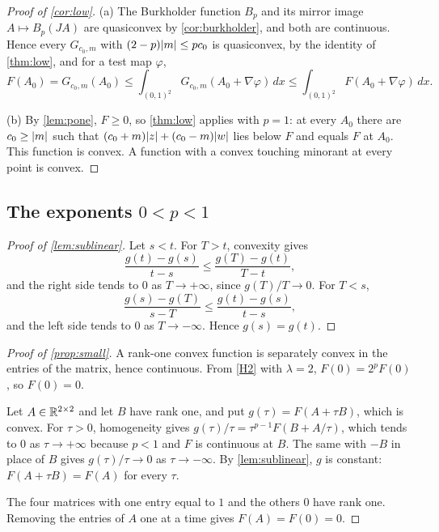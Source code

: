 \begin{proof}[Proof of \cref{cor:low}]
(a) The Burkholder function $B_p$ and its mirror image $A\mapsto B_p(JA)$ are quasiconvex by
\cref{cor:burkholder}, and both are continuous. Hence every
$G_{c_0,m}$ with $(2-p)\lvert m\rvert\le pc_0$ is quasiconvex, by the identity of \cref{thm:low}, and
for a test map $\varphi$,
\[
  F(A_0)=G_{c_0,m}(A_0)\le\int_{(0,1)^2}G_{c_0,m}(A_0+\nabla\varphi)\,dx
  \le\int_{(0,1)^2}F(A_0+\nabla\varphi)\,dx .
\]

(b) By \cref{lem:pone}, $F\ge0$, so \cref{thm:low} applies with $p=1$: at every
$A_0$ there are $c_0\ge\lvert m\rvert$ such that $(c_0+m)\lvert z\rvert+(c_0-m)\lvert w\rvert$ lies below $F$ and equals
$F$ at $A_0$. This function is convex. A function with a convex touching minorant at every
point is convex.
\end{proof}

\subsection{The exponents \texorpdfstring{$0<p<1$}{0 < p < 1}}

\begin{proof}[Proof of \cref{lem:sublinear}]
Let $s<t$. For $T>t$, convexity gives
\[
  \frac{g(t)-g(s)}{t-s}\le\frac{g(T)-g(t)}{T-t},
\]
and the right side tends to $0$ as $T\to+\infty$, since $g(T)/T\to0$. For $T<s$,
\[
  \frac{g(s)-g(T)}{s-T}\le\frac{g(t)-g(s)}{t-s},
\]
and the left side tends to $0$ as $T\to-\infty$. Hence $g(s)=g(t)$.
\end{proof}

\begin{proof}[Proof of \cref{prop:small}]
A rank-one convex function is separately convex in the entries of the matrix, hence continuous.
From \ref{H2} with $\lambda=2$, $F(0)=2^pF(0)$, so $F(0)=0$.

Let $A\in\mathbb{R}^{2\times 2}$ and let $B$ have rank one, and put $g(\tau)=F(A+\tau B)$, which is convex. For
$\tau>0$, homogeneity gives $g(\tau)/\tau=\tau^{p-1}F(B+A/\tau)$, which tends to $0$ as
$\tau\to+\infty$ because $p<1$ and $F$ is continuous at $B$. The same with $-B$ in place of $B$
gives $g(\tau)/\tau\to0$ as $\tau\to-\infty$. By \cref{lem:sublinear}, $g$ is constant:
$F(A+\tau B)=F(A)$ for every $\tau$.

The four matrices with one entry equal to $1$ and the others $0$ have rank one. Removing the
entries of $A$ one at a time gives $F(A)=F(0)=0$.
\end{proof}
